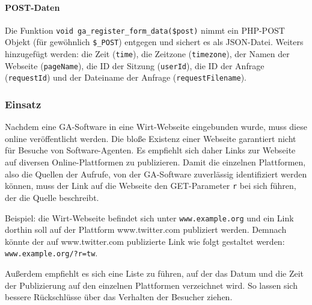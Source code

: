 \paragraph{POST-Daten}
\label{par:ga_post_daten}
Die Funktion \texttt{void\ ga\_register\_form\_data(\$post)} nimmt ein PHP-POST
Objekt (für gewöhnlich \texttt{\$\_POST}) entgegen und sichert es als
JSON-Datei. Weiters hinzugefügt werden: die Zeit (\texttt{time}), die Zeitzone
(\texttt{timezone}), der Namen der Webseite (\texttt{pageName}), die ID der
Sitzung (\texttt{userId}), die ID der Anfrage (\texttt{requestId}) und der
Dateiname der Anfrage (\texttt{requestFilename}).

\subsubsection{Einsatz}
\label{ssub:ga_einsatz}
Nachdem eine GA-Software in eine Wirt-Webseite eingebunden wurde, muss diese
online veröffentlicht werden. Die bloße Existenz einer Webseite garantiert
nicht für Besuche von Software-Agenten. Es empfiehlt sich daher Links zur
Webseite auf diversen Online-Plattformen zu publizieren. Damit die einzelnen
Plattformen, also die Quellen der Aufrufe, von der GA-Software zuverlässig
identifiziert werden können, muss der Link auf die Webseite den GET-Parameter
\texttt{r} bei sich führen, der die Quelle beschreibt.

Beispiel: die Wirt-Webseite befindet sich unter \texttt{www.example.org} und
ein Link dorthin soll auf der Plattform www.twitter.com publiziert werden.
Demnach könnte der auf www.twitter.com publizierte Link wie folgt gestaltet
werden: \texttt{www.example.org/?r=tw}.

Außerdem empfiehlt es sich eine Liste zu führen, auf der das Datum und die Zeit
der Publizierung auf den einzelnen Plattformen verzeichnet wird. So lassen sich
bessere Rückschlüsse über das Verhalten der Besucher ziehen.
